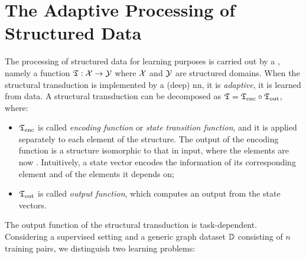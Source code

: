 \section{The Adaptive Processing of Structured Data}
The processing of structured data for learning purposes is carried out by a , namely a function $\Transduction: \Cal{x} \shortrightarrow \Cal{y}$ where $\Cal{X}$ and $\Cal{Y}$ are structured domains. When the structural transduction is implemented by a (deep) \gls{nn}, it is \emph{adaptive}, \ie it is learned from data. A structural transduction can be decomposed as $\mathfrak{T} = \mathfrak{T}_{\mathrm{enc}} \circ \mathfrak{T}_{\mathrm{out}}$, where:
\begin{itemize}
    \item $\mathfrak{T}_{\mathrm{enc}}$ is called \emph{encoding function} or \emph{state transition function}, and it is applied separately to each element of the structure. The output of the encoding function is a structure isomorphic to that in input, where the elements are now . Intuitively, a state vector encodes the information of its corresponding element and of the elements it depends on;
    \item $\mathfrak{T}_{\mathrm{out}}$ is called \emph{output function}, which computes an output from the state vectors.
\end{itemize}
The output function of the structural transduction is task-dependent. Considering a supervised setting and a generic graph dataset $\mathbb{D}$ consisting of $n$ training pairs, we distinguish two learning problems:
